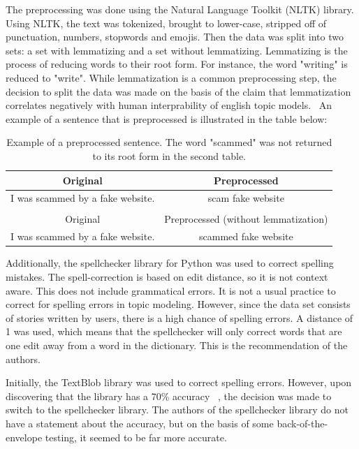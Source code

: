The preprocessing was done using the Natural Language Toolkit (NLTK) library. Using NLTK, the text was tokenized, brought to lower-case, stripped off of punctuation, numbers, stopwords and emojis. Then the data was split into two sets: a set with lemmatizing and a set without lemmatizing. Lemmatizing is the process of reducing words to their root form. For instance, the word "writing" is reduced to "write". While lemmatization is a common preprocessing step, the decision to split the data was made on the basis of the claim that lemmatization correlates negatively with human interprability of english topic models.~\cite{schofield2016comparing} An example of a sentence that is preprocessed is illustrated in the table below:


\begin{table}[h]
    \centering
    \begin{tabular}{cc}
        Original & Preprocessed \\ \hline
        I was scammed by a fake website. & scam fake website \\
        \\
        Original & Preprocessed (without lemmatization) \\ \hline
        I was scammed by a fake website. & scammed fake website \\
    \end{tabular}
    \caption{Example of a preprocessed sentence. The word "scammed" was not returned to its root form in the second table.}
    \label{tab:preprocessing}
\end{table}

Additionally, the spellchecker library for Python was used to correct spelling mistakes. The spell-correction is based on edit distance, so it is not context aware. This does not include grammatical errors. It is not a usual practice to correct for spelling errors in topic modeling. However, since the data set consists of stories written by users, there is a high chance of spelling errors. A distance of 1 was used, which means that the spellchecker will only correct words that are one edit away from a word in the dictionary. This is the recommendation of the authors.~\cite{spellchecker2023}

Initially, the TextBlob library was used to correct spelling errors. However, upon discovering that the library has a 70\% accuracy ~\cite{loria2018textblob}, the decision was made to switch to the spellchecker library. The authors of the spellchecker library do not have a statement about the accuracy, but on the basis of some back-of-the-envelope testing, it seemed to be far more accurate.


